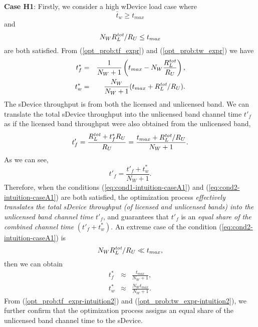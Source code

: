 \documentclass[journal,final,letterpaper,10pt,doublecolumn,twoside]{IEEEtran}
\begin{document}
\textbf{Case H1}: Firstly, we consider a high wDevice load case where
\begin{equation}
\bar{t}_w \geq t_{max}  \label{eq:cond1-intuition-caseA1}
\end{equation}
and
\begin{equation}
N_W
R^{\emph{tot}}_L /{R_U} \leq t_{max} \label{eq:cond2-intuition-caseA1}
\end{equation}
are both satisfied.
From (\ref{opt_prob:tf_expr})  and (\ref{opt_prob:tw_expr}) we have
\begin{eqnarray}\nonumber
t_f^* &=&  \frac{1}{N_W +1}  \left( t_{max} - N_W
\frac{R^{\emph{tot}}_L}{R_U}  \right),
\label{opt_prob:tf_expr-intuition1} \\
t_w^*&=&  \frac{N_W}{N_W +1}  (t_{max} + R^{\emph{tot}}_L / R_U) .  \label{opt_prob:tw_expr-intuition1}
\end{eqnarray}
The sDevice throughput is from both the licensed and unlicensed band. We can translate the total sDevice throughput into the unlicensed band channel time $t'_f$ as if the licensed band throughput were also obtained from the unlicensed band,
\begin{equation}
t'_f =\frac{R^{\emph{tot}}_L + t_f^* R_U}{R_U} = \frac{t_{max} + R^{\emph{tot}}_L / R_U}{N_W + 1}.
\end{equation}
As we can see,
\begin{equation}
t'_f = \frac{t'_f+t_w^*}{ N_W + 1}.
\end{equation}
Therefore, when the conditions (\ref{eq:cond1-intuition-caseA1}) and (\ref{eq:cond2-intuition-caseA1}) are both satisfied, the optimization process \emph{effectively translates the total sDevice throughput (of licensed and unlicensed bands) into the unlicensed band channel time} $t'_f$, and guarantees  that $t'_f$ is an \emph{equal share of the combined channel time} $(t'_f+t_w^*)$.
An extreme case of the condition (\ref{eq:cond2-intuition-caseA1})  is
\begin{equation}
N_W
R^{\emph{tot}}_L /{R_U} \ll t_{max}, \label{eq:cond3-intuition-caseA1}
\end{equation}
then we can obtain
\begin{eqnarray}
t_f^* & \approx &  \frac{t_{max}}{N_W +1}  ,
\label{opt_prob:tf_expr-intuition2} \\
t_w^*& \approx &  \frac{N_W t_{max}}{N_W +1}.  \label{opt_prob:tw_expr-intuition2}
\end{eqnarray}
From  (\ref{opt_prob:tf_expr-intuition2}) and (\ref{opt_prob:tw_expr-intuition2}), we further confirm that the optimization process assigns an equal share of the unlicensed band channel time to the sDevice.
\end{document}
